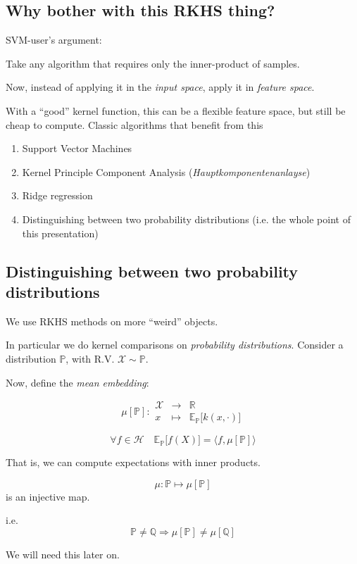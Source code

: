 \subsection*{Why bother with this RKHS thing?}

SVM-user's argument:

Take any algorithm that requires only the inner-product of samples.

Now, instead of applying it in the \emph{input space}, apply it in \emph{feature space}.

With a ``good'' kernel function, this can be a flexible feature space, but still be cheap to compute.
\clearpage
Classic algorithms that benefit from this
\begin{enumerate}
\item Support Vector Machines
\item Kernel Principle Component Analysis (\emph{Hauptkomponentenanlayse})
\item Ridge regression
\item Distinguishing between two probability distributions (i.e. the whole point of this presentation)
\end{enumerate}

\subsection*{Distinguishing between two probability distributions}
We use RKHS methods on more ``weird'' objects.

In particular we do kernel comparisons on \emph{probability distributions}.
\clearpage	
Consider a distribution $\mathbb{P}$, with R.V. $\mathcal{X}\sim\mathbb{P}$.

Now, define the \emph{mean embedding}:

\begin{equation*}
\mu[\mathbb{P}]: \begin{matrix}
        \mathcal{X}  &\rightarrow &\mathbb{R}\\
        x &\mapsto &\mathbb{E}_\mathbb{P} \big[ k(x,\cdot) \big]
        \end{matrix}
\end{equation*}
\clearpage	
\begin{fact}
	\begin{equation*}
		\forall f \in \mathcal{H} \quad \mathbb{E}_\mathbb{P} \big[ f(X) \big] = \langle f, \mu[\mathbb{P}]\rangle
	\end{equation*}
\end{fact}
That is, we can compute expectations with inner products.
\clearpage	
\begin{fact}
	\begin{equation*}
		\mu: \mathbb{P} \mapsto \mu[\mathbb{P}]
	\end{equation*}
	is an injective map.
	
	i.e.
	\begin{equation*}
		\mathbb{P}\ne\mathbb{Q} \Rightarrow \mu[\mathbb{P}] \ne \mu[\mathbb{Q}]
	\end{equation*}
	
	We will need this later on.
\end{fact}

